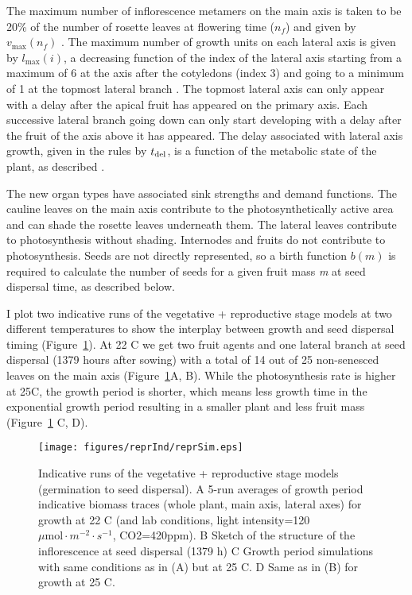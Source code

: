 The maximum number of inflorescence metamers on the main axis is taken to be
20\% of the number of rosette leaves at flowering time (\(n_{f}\)) and given by
\(v_{\max}(n_{f})\) \citep{pouteau_significance_2009}. The maximum number of
growth units on each lateral axis is given by \(l_{\max}(i)\), a decreasing
function of the index of the lateral axis starting from a maximum of 6 at the
axis after the cotyledons (index 3) and going to a minimum of 1 at the topmost
lateral branch \citep{mundermann_quantitative_2005}. The topmost lateral axis
can only appear with a delay after the apical fruit has appeared on the primary
axis. Each successive lateral branch going down can only start developing with a
delay after the fruit of the axis above it has appeared. The delay associated
with lateral axis growth, given in the rules by \(t_{\mathrm{del}}\), is a function
of the metabolic state of the plant, as described
\citep{christophe_model-based_2008}.

The new organ types have associated sink strengths and demand functions.  The
cauline leaves on the main axis contribute to the photosynthetically active area
and can shade the rosette leaves underneath them. The lateral leaves contribute
to photosynthesis without shading. Internodes and fruits do not contribute to
photosynthesis. Seeds are not directly represented, so a birth function \(b(m)\)
is required to calculate the number of seeds for a given fruit mass \emph{m} at
seed dispersal time, as described below.

I plot two indicative runs of the vegetative + reproductive stage models at two
different temperatures to show the interplay between growth and seed dispersal
timing (Figure~\ref{fig:reprGInd}). At 22 \textdegree C we get two fruit agents and
one lateral branch at seed dispersal (1379 hours after sowing) with a total of
14 out of 25 non-senesced leaves on the main axis (Figure~\ref{fig:reprGInd}A,
B). While the photosynthesis rate is higher at 25\textdegree C, the growth
period is shorter, which means less growth time in the exponential growth period
resulting in a smaller plant and less fruit mass (Figure~\ref{fig:reprGInd} C,
D).

\begin{figure}[p]
  \centering
  \texttt{[image: figures/reprInd/reprSim.eps]}
  \caption{Indicative runs of the vegetative + reproductive stage models
    (germination to seed dispersal). A 5-run averages of growth period indicative
    biomass traces (whole plant, main axis, lateral axes) for growth at 22
    \textdegree C (and lab conditions, light
    intensity=120$\mu \mathrm{mol} \cdot m^{-2} \cdot s^{-1}$, CO2=420ppm). B
    Sketch of the structure of the inflorescence at seed dispersal (1379 h) C Growth
    period simulations with same conditions as in (A) but at 25 \textdegree C. D
    Same as in (B) for growth at 25 \textdegree C.}
  \label{fig:reprGInd}
\end{figure}

